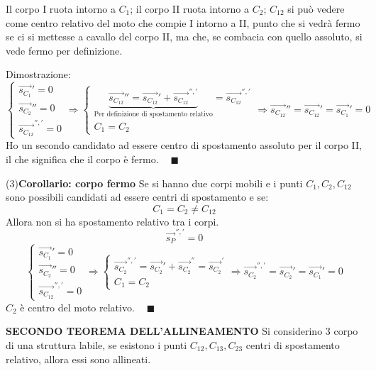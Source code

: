 \documentclass{article}
\begin{document}
\begin{adjustwidth}{2in}{}
Il corpo I ruota intorno a $C_1$; il corpo II ruota intorno a $C_2$; $C_{12}$ si può vedere come centro relativo del moto che compie I intorno a II, punto che si vedrà fermo se ci si mettesse a cavallo del corpo II, ma che, se combacia con quello assoluto, si vede fermo per definizione. 

Dimostrazione:
\[
\begin{cases}
\vec{s_{C_1}}' = 0 \\
\vec{s_{C_2}}'' = 0 \\
\vec{s_{C_{12}}}^{'','} = 0
\end{cases} \Rightarrow \begin{cases}
\underbrace{\vec{s_{C_{12}}}'' = \vec{s_{C_{12}}}' + \vec{s_{C_{12}}}^{'','}}_\text{Per definizione di spostamento relativo} = \vec{s_{C_{12}}}^{'','} \\
C_1 = C_2
\end{cases} \Rightarrow \vec{s_{C_{12}}}'' = \vec{s_{C_{12}}}' = \vec{s_{C_1}}' = 0
\]
Ho un secondo candidato ad essere centro di spostamento assoluto per il corpo II, il che significa che il corpo è fermo. $ ~~~~ \blacksquare $ \newline

(3)\textbf{Corollario: corpo fermo} \newline
Se si hanno due corpi mobili e i punti $C_1, C_2, C_{12}$ sono possibili candidati ad essere centri di spostamento e se: 
\[
C_1 = C_2 \ne C_{12} 
\]
Allora non si ha spostamento relativo tra i corpi.
\[
\vec{s_P}^{'','} = 0
\]
\[
\begin{cases}
	\vec{s_{C_1}}' = 0 \\
	\vec{s_{C_2}}'' = 0 \\
	\vec{s_{C_{12}}}^{'','} = 0
\end{cases} \Rightarrow \begin{cases}
	\vec{s_{C_{2}}}^{'','} = \vec{s_{C_{2}}}' + \vec{s_{C_{2}}}^{''} = \vec{s_{C_{2}}}^{'} \\
	C_1 = C_2
\end{cases} \Rightarrow \vec{s_{C_{2}}}^{'','} = \vec{s_{C_{2}}}' = \vec{s_{C_1}}' = 0
\]
$C_2$ è centro del moto relativo. $ ~~~~ \blacksquare $ \newline

\textbf{SECONDO TEOREMA DELL'ALLINEAMENTO} \newline
Si considerino 3 corpo di una struttura labile, se esistono i punti $C_{12}, C_{13}, C_{23}$ centri di spostamento relativo, allora essi sono allineati. \newline 





\end{adjustwidth}
\end{document}
